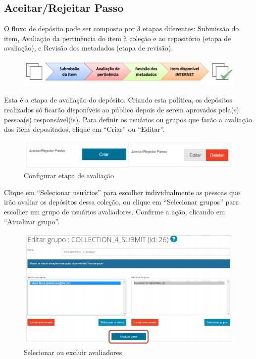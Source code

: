 \documentclass[12pt,hidelinks]{article}
\begin{document}
    \subsection{Aceitar/Rejeitar Passo}
    
    O fluxo de depósito pode ser composto por 3 etapas diferentes: Submissão do item, Avaliação da pertinência do item à coleção e ao repositório (etapa de avaliação), e Revisão dos metadados (etapa de revisão).
    
    \begin{figure}[!htp]
                \centering
                \includegraphics[scale=0.7]{figura/Aceitar-Rejeitar-passo.png}
            \label{Rotulo}
        \end{figure}
    
    Esta é a etapa de avaliação do depósito. Criando esta política, os depósitos realizados só ficarão disponíveis ao público depois de serem aprovados pela(s) pessoa(s) responsável(is). Para definir os usuários ou grupos que farão a avaliação dos itens depositados, clique em “Criar” ou “Editar”.
    
    \begin{figure}[!htp]
                \centering
                \includegraphics[scale=0.7]{figura/Figura44.png}
                \caption{Configurar etapa de avaliação}
            \label{Rotulo}
        \end{figure}
        
    Clique em “Selecionar usuários” para escolher individualmente as pessoas que irão avaliar os depósitos dessa coleção, ou clique em “Selecionar grupos” para escolher um grupo de usuários avaliadores. Confirme a ação, clicando em “Atualizar grupo”.
    
    \begin{figure}[!htp]
                \centering
                \includegraphics[scale=0.9]{figura/Figura45.png}
                \caption{Selecionar ou excluir avaliadores}
            \label{Rotulo}
        \end{figure}
        
\end{document}
